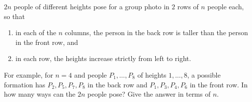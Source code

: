 $2n$ people of different heights pose for a group photo in $2$ rows of $n$ people each, so that
\begin{enumerate}
\item[(a)] in each of the $n$ columns, the person in the back row is taller than the person in the front row, and
\item[(b)] in each row, the heights increase strictly from left to right.
\end{enumerate}
For example, for $n=4$ and people $P_1,\dots,P_8$ of heights $1,\dots,8$, a possible formation has $P_2,P_5,P_7,P_8$ in the back row and $P_1,P_3,P_4,P_6$ in the front row. In how many ways can the $2n$ people pose? Give the answer in terms of $n$.
